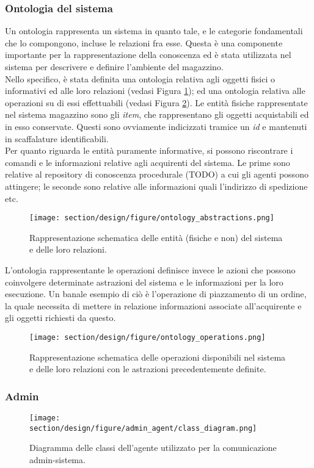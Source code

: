 \subsubsection{Ontologia del sistema}
Un ontologia rappresenta un sistema in quanto tale, e le categorie fondamentali che lo compongono, incluse le relazioni fra esse. Questa è una componente importante per la rappresentazione della conoscenza ed è stata utilizzata nel sistema per descrivere e definire l'ambiente del magazzino.\\
Nello specifico, è stata definita una ontologia relativa agli oggetti fisici o informativi ed alle loro relazioni (vedasi Figura \ref{fig:ontology_abstractions}); ed una ontologia relativa alle operazioni su di essi effettuabili (vedasi Figura \ref{fig:ontology_operations}).
\parag
Le entità fisiche rappresentate nel sistema magazzino sono gli \textit{item}, che rappresentano gli oggetti acquistabili ed in esso conservate. Questi sono ovviamente indicizzati tramice un \textit{id} e mantenuti in scaffalature identificabili.\\
Per quanto riguarda le entità puramente informative, si possono riscontrare i comandi e le informazioni relative agli acquirenti del sistema. Le prime sono relative al repository di conoscenza procedurale (TODO) a cui gli agenti possono attingere; le seconde sono relative alle informazioni quali l'indirizzo di spedizione etc. 
\begin{figure}[ht]
    \texttt{[image: section/design/figure/ontology\_abstractions.png]}
    \caption{Rappresentazione schematica delle entità (fisiche e non) del sistema e delle loro relazioni.}
    \label{fig:ontology_abstractions}
\end{figure}
\parag
L'ontologia rappresentante le operazioni definisce invece le azioni che possono coinvolgere determinate astrazioni del sistema e le informazioni per la loro esecuzione. Un banale esempio di ciò è l'operazione di piazzamento di un ordine, la quale necessita di mettere in relazione informazioni associate all'acquirente e gli oggetti richiesti da questo.
\begin{figure}[ht]
    \texttt{[image: section/design/figure/ontology\_operations.png]}%
    \caption{Rappresentazione schematica delle operazioni disponibili nel sistema e delle loro relazioni con le astrazioni precedentemente definite.}
    \label{fig:ontology_operations}
\end{figure}

\subsubsection{Admin}
\begin{figure}[ht]
    \texttt{[image: section/design/figure/admin\_agent/class\_diagram.png]}
    \caption{Diagramma delle classi dell'agente utilizzato per la comunicazione admin-sistema.}
    \label{fig:class_diagram_admin_agent}
\end{figure}
